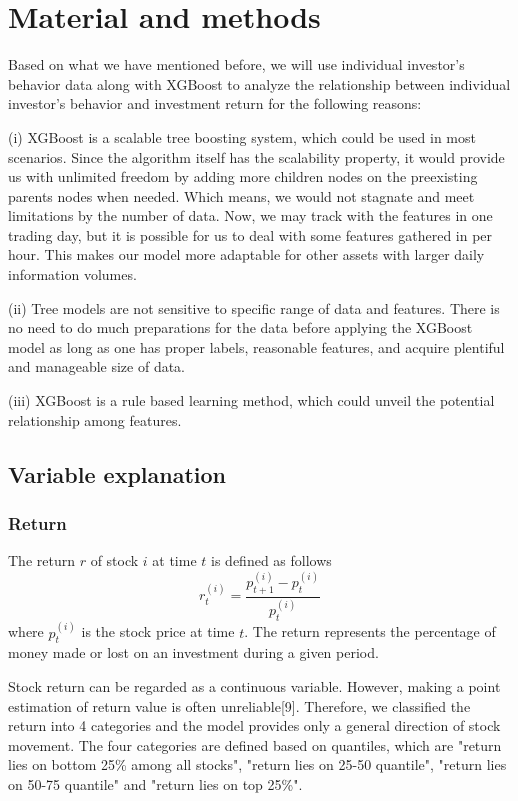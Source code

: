 \documentclass[letterpaper]{article}
\begin{document}
\section{Material and methods}
\label{material_method}
Based on what we have mentioned before, we will use individual investor's behavior data along with XGBoost to analyze the relationship between individual investor's behavior and investment return for the following reasons:

(i) XGBoost is a scalable tree boosting system, which could be used in most scenarios. Since the algorithm itself has the scalability property, it would provide us with unlimited freedom by adding more children nodes on the preexisting parents nodes when needed. Which means, we would not stagnate and meet limitations by the number of data. Now, we may track with the features in one trading day, but it is possible for us to deal with some features gathered in per hour. This makes our model more adaptable for other assets with larger daily information volumes. 

(ii) Tree models are not sensitive to specific range of data and features. There is no need to do much preparations for the data before applying the XGBoost model as long as one has proper labels, reasonable features, and acquire plentiful and manageable size of data. 

(iii) XGBoost is a rule based learning method, which could unveil the potential relationship among features.

\subsection{Variable explanation}
\subsubsection{Return}
The return $r$ of stock $i$ at time $t$ is defined as follows
$$
r_{t}^{(i)}=\frac{p_{t+1}^{(i)}-p_{t}^{(i)}}{p_{t}^{(i)}}
$$
where $p_{t}^{(i)}$ is the stock price at time $t$. The return represents the percentage of money made or lost on an investment during a given period.

Stock return can be regarded as a continuous variable. However, making a point estimation of return value is often unreliable[9]. Therefore, we classified the return into 4 categories and the model provides only a general direction of stock movement. The four categories are defined based on quantiles, which are "return lies on bottom 25\% among all stocks", "return lies on 25-50 quantile", "return lies on 50-75 quantile" and "return lies on top 25\%". 
\end{document}
